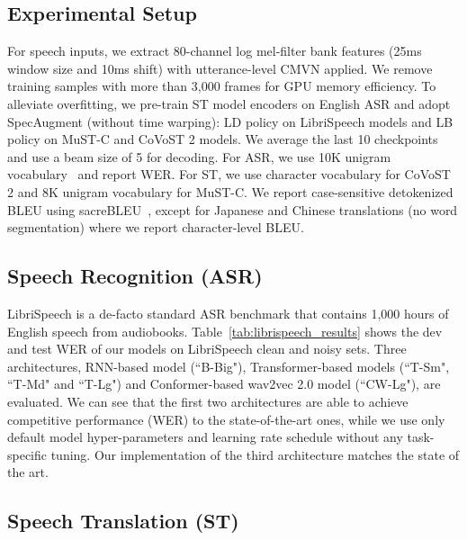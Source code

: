 \documentclass[11pt,a4paper]{article}
\begin{document}
\subsection{Experimental Setup}
For speech inputs, we extract 80-channel log mel-filter bank features (25ms window size and 10ms shift) with utterance-level CMVN applied. We remove training samples with more than 3,000 frames for GPU memory efficiency. To alleviate overfitting, we pre-train ST model encoders on English ASR and adopt SpecAugment (without time warping): LD policy on LibriSpeech models and LB policy on MuST-C and CoVoST 2 models. We average the last 10 checkpoints and use a beam size of 5 for decoding. For ASR, we use 10K unigram vocabulary~\citep{kudo-richardson-2018-sentencepiece} and report WER. For ST, we use character vocabulary for CoVoST 2 and 8K unigram vocabulary for MuST-C. We report case-sensitive detokenized BLEU using sacreBLEU~\cite{post-2018-call}, except for Japanese and Chinese translations (no word segmentation) where we report character-level BLEU.

\subsection{Speech Recognition (ASR)}
LibriSpeech is a de-facto standard ASR benchmark that contains 1,000 hours of English speech from audiobooks. Table~\ref{tab:librispeech_results} shows the dev and test WER of our models on LibriSpeech clean and noisy sets. Three architectures, RNN-based model (``B-Big"), Transformer-based models (``T-Sm", ``T-Md" and ``T-Lg") and Conformer-based wav2vec 2.0 model (``CW-Lg"), are evaluated. We can see that the first two architectures are able to achieve competitive performance (WER) to the state-of-the-art ones, while we use only default model hyper-parameters and learning rate schedule without any task-specific tuning. Our implementation of the third architecture matches the state of the art.


\subsection{Speech Translation (ST)}
\end{document}
